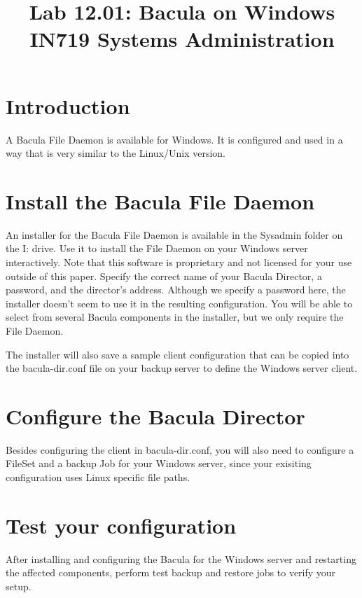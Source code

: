 \documentclass{article}   	%
\title{Lab 12.01:  Bacula on Windows\\ IN719 Systems Administration}
\date{}							%
\begin{document}
\maketitle

\section*{Introduction}
A Bacula File Daemon is available for Windows. It is configured and used in a way that is very similar to the Linux/Unix version.

\section{Install the Bacula File Daemon}
An installer for the Bacula File Daemon is available in the Sysadmin folder on the I: drive.  Use it to install the File Daemon on your Windows server interactively.  Note that this software is proprietary and not licensed for your use outside of this paper.  Specify the correct name of your Bacula Director, a password, and the director's address.  Although we specify a password here, the installer doesn't seem to use it in the resulting configuration.  You will be able to select from several Bacula components in the installer, but we only require the File Daemon.

The installer will also save a sample client configuration that can be copied into the bacula-dir.conf file on your backup server to define the Windows server client.

\section{Configure the Bacula Director}
Besides configuring the client in bacula-dir.conf, you will also need to configure a FileSet and a backup Job for your Windows server, since your exisiting configuration uses Linux specific file paths.

\section{Test your configuration}
After installing and configuring the Bacula for the Windows server and restarting the affected components, perform test backup and restore jobs to verify your setup.
\end{document}
